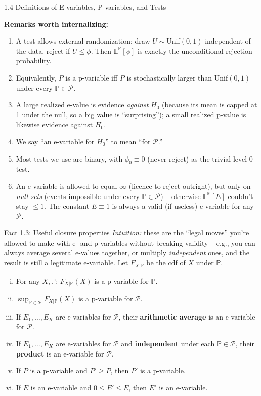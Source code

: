 \documentclass[aspectratio=169,10pt]{beamer}
\begin{document}
\begin{frame}[allowframebreaks]{1.4 Definitions of E-variables, P-variables, and Tests}
\framebreak

\textbf{Remarks worth internalizing:}
\begin{enumerate}
  \item A test allows external randomization: draw $U\sim\mathrm{Unif}(0,1)$
    independent of the data, reject if $U\le\phi$. Then
    $\mathbb{E}^{\mathbb{P}}[\phi]$ is exactly the unconditional rejection
    probability.
  \item Equivalently, $P$ is a p-variable iff $P$ is stochastically larger
    than $\mathrm{Unif}(0,1)$ under every $\mathbb{P}\in\mathcal{P}$.
  \item A large realized e-value is evidence \emph{against} $H_0$ (because
    its mean is capped at 1 under the null, so a big value is ``surprising'');
    a small realized p-value is likewise evidence against $H_0$.
  \item We say ``an e-variable for $H_0$'' to mean ``for $\mathcal{P}$.''
  \item Most tests we use are binary, with $\phi_0\equiv 0$ (never reject)
    as the trivial level-0 test.
  \item An e-variable is allowed to equal $\infty$ (licence to reject
    outright), but only on \emph{null-sets} (events impossible under every
    $\mathbb{P}\in\mathcal{P}$) -- otherwise $\mathbb{E}^{\mathbb{P}}[E]$
    couldn't stay $\le 1$. The constant $E\equiv 1$ is always a valid
    (if useless) e-variable for any $\mathcal{P}$.
\end{enumerate}

\framebreak

\begin{block}{Fact 1.3: Useful closure properties}
\emph{Intuition:} these are the ``legal moves'' you're allowed to make
with e- and p-variables without breaking validity -- e.g., you can always
average several e-values together, or multiply \emph{independent} ones,
and the result is still a legitimate e-variable. Let $F_{X|\mathbb{P}}$ be
the cdf of $X$ under $\mathbb{P}$.
\begin{enumerate}[(i)]
  \item For any $X,\mathbb{P}$: $F_{X|\mathbb{P}}(X)$ is a p-variable for
    $\mathbb{P}$.
  \item $\sup_{\mathbb{P}\in\mathcal{P}} F_{X|\mathbb{P}}(X)$ is a
    p-variable for $\mathcal{P}$.
  \item If $E_1,\dots,E_K$ are e-variables for $\mathcal{P}$, their
    \textbf{arithmetic average} is an e-variable for $\mathcal{P}$.
  \item If $E_1,\dots,E_K$ are e-variables for $\mathcal{P}$ and
    \textbf{independent} under each $\mathbb{P}\in\mathcal{P}$, their
    \textbf{product} is an e-variable for $\mathcal{P}$.
  \item If $P$ is a p-variable and $P'\ge P$, then $P'$ is a p-variable.
  \item If $E$ is an e-variable and $0\le E'\le E$, then $E'$ is an e-variable.
\end{enumerate}
\end{block}


\end{frame}
\end{document}
